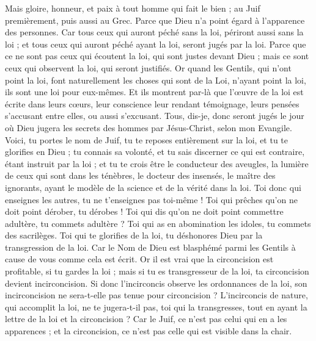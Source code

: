 \begin{multicols}{2}
Mais gloire, honneur, et paix à tout homme qui fait le bien ; au Juif premièrement, puis aussi au Grec.
Parce que Dieu n'a point égard à l'apparence des personnes.
Car tous ceux qui auront péché sans la loi, périront aussi sans la loi ; et tous ceux qui auront péché ayant la loi, seront jugés par la loi.
Parce que ce ne sont pas ceux qui écoutent la loi, qui sont justes devant Dieu ; mais ce sont ceux qui observent la loi, qui seront justifiés.
Or quand les Gentils, qui n'ont point la loi, font naturellement les choses qui sont de la Loi, n'ayant point la loi, ils sont une loi pour eux-mêmes.
Et ils montrent par-là que l'œuvre de la loi est écrite dans leurs cœurs, leur conscience leur rendant témoignage, leurs pensées s'accusant entre elles, ou aussi s'excusant.
Tous, dis-je, donc seront jugés le jour où Dieu jugera les secrets des hommes par Jésus-Christ, selon mon Evangile.
Voici, tu portes le nom de Juif, tu te reposes entièrement sur la loi, et tu te glorifies en Dieu ;
tu connais sa volonté, et tu sais discerner ce qui est contraire, étant instruit par la loi ; 
et tu te crois être le conducteur des aveugles, la lumière de ceux qui sont dans les ténèbres,
le docteur des insensés, le maître des ignorants, ayant le modèle de la science et de la vérité dans la loi.
Toi donc qui enseignes les autres, tu ne t'enseignes pas toi-même ! Toi qui prêches qu'on ne doit point dérober, tu dérobes !
Toi qui dis qu'on ne doit point commettre adultère, tu commets adultère ? Toi qui as en abomination les idoles, tu commets des sacrilèges.
Toi qui te glorifies de la loi, tu déshonores Dieu par la transgression de la loi.
Car le Nom de Dieu est blasphémé parmi les Gentils à cause de vous comme cela est écrit.
Or il est vrai que la circoncision est profitable, si tu gardes la loi ; mais si tu es transgresseur de la loi, ta circoncision devient incirconcision.
Si donc l'incirconcis observe les ordonnances de la loi, son incirconcision ne sera-t-elle pas tenue pour circoncision ?
L'incirconcis de nature, qui accomplit la loi, ne te jugera-t-il pas, toi qui la transgresses, tout en ayant la lettre de la loi et la circoncision ?
Car le Juif, ce n'est pas celui qui en a les apparences ; et la circoncision, ce n'est pas celle qui est visible dans la chair.

\end{multicols}

